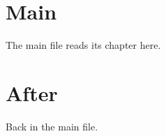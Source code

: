 \documentclass{article}
\begin{document}
\section{Main}
The main file reads its chapter here.



\section{After}
Back in the main file.
\end{document}
